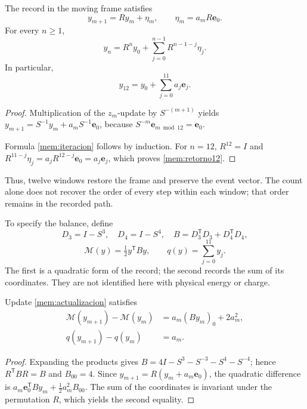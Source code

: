 \begin{proposition}
\label{mem:prop-actualizacion}
The record in the moving frame satisfies
\begin{equation}
 y_{m+1}=Ry_m+\eta_m,\qquad
 \eta_m=a_mR\mathbf e_0.
 \label{mem:actualizacion}
\end{equation}
For every \(n\geq1\),
\begin{equation}
 y_n=R^ny_0+\sum_{j=0}^{n-1}R^{n-1-j}\eta_j.
 \label{mem:iteracion}
\end{equation}
In particular,
\begin{equation}
 y_{12}=y_0+\sum_{j=0}^{11}a_j\mathbf e_j.
 \label{mem:retorno12}
\end{equation}
\end{proposition}
\begin{proof}
Multiplication of the \(z_m\)-update by \(S^{-(m+1)}\) yields
\(y_{m+1}=S^{-1}y_m+a_mS^{-1}\mathbf e_0\), because
\(S^{-m}\mathbf e_{m\bmod12}=\mathbf e_0\).

Formula \eqref{mem:iteracion} follows by induction.
For \(n=12\), \(R^{12}=I\) and
\(R^{11-j}\eta_j=a_jR^{12-j}\mathbf e_0=a_j\mathbf e_j\),
which proves \eqref{mem:retorno12}.
\end{proof}

Thus, twelve windows restore the frame and preserve the event vector.
The count alone does not recover the order of every step
within each window; that order remains in the recorded path.

To specify the balance, define
\[
 D_3=I-S^3,\quad D_4=I-S^4,\quad
 B=D_3^{\mathsf T}D_3+D_4^{\mathsf T}D_4,
\]
\[
 \mathcal M(y)=\tfrac12y^{\mathsf T}By,
 \qquad q(y)=\sum_{j=0}^{11}y_j.
\]
The first is a quadratic form of the record; the second records
the sum of its coordinates. They are not identified here with physical energy or charge.

\begin{proposition}
\label{mem:prop-balance}
Update \eqref{mem:actualizacion} satisfies
\begin{equation}
 \begin{aligned}
 \mathcal M(y_{m+1})-\mathcal M(y_m)
   &=a_m(By_m)_0+2a_m^2,\\
 q(y_{m+1})-q(y_m)&=a_m.
 \end{aligned}
 \label{mem:balance}
\end{equation}
\end{proposition}
\begin{proof}
Expanding the products gives
\(B=4I-S^3-S^{-3}-S^4-S^{-4}\); hence
\(R^{\mathsf T}BR=B\) and \(B_{00}=4\).
Since \(y_{m+1}=R(y_m+a_m\mathbf e_0)\), the quadratic difference
is \(a_m\mathbf e_0^{\mathsf T}By_m+\tfrac12a_m^2B_{00}\).
The sum of the coordinates is invariant under the permutation \(R\),
which yields the second equality.
\end{proof}

